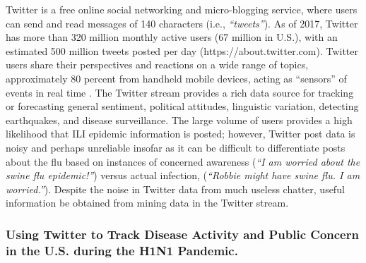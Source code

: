 \documentclass[sigconf]{acmart}
\begin{document}
Twitter is a free online social networking and micro-blogging service, where users can send 
and read messages of 140 characters (i.e., {\it ``tweets''}). As of 2017, Twitter has more 
than 320 million monthly active users (67 million in U.S.), with an estimated 500 million 
tweets posted per day (https://about.twitter.com). Twitter users share their perspectives and
reactions on a wide range of topics, approximately 80 percent from handheld mobile devices, 
acting as ``sensors'' of events in real time \cite{achrekar12}. The Twitter stream provides 
a rich data source for tracking or forecasting general sentiment, political attitudes, 
linguistic variation, detecting earthquakes, and disease surveillance. The large volume of 
users provides a high likelihood that ILI epidemic information is posted; however, Twitter 
post data is noisy and perhaps unreliable insofar as it can be difficult to differentiate 
posts about the flu based on instances of concerned awareness ({\it ``I am worried about 
the swine flu epidemic!''}) versus actual infection, ({\it ``Robbie might have swine flu. 
I am worried.''})\cite{lamb13}. Despite the noise in Twitter data from much useless chatter, 
useful information be obtained from mining data in the Twitter stream. 

\subsubsection{Using Twitter to Track Disease Activity and Public Concern in the 
U.S. during the H1N1 Pandemic.}
\end{document}
